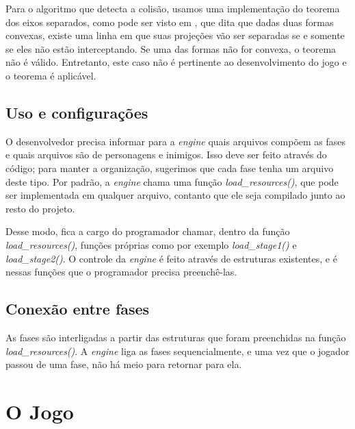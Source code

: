\documentclass[brazil]{abnt}
\begin{document}
Para o algoritmo que detecta a colisão, usamos uma implementação do teorema dos eixos separados, como pode ser visto em \cite{SeparatingAxes}, que dita que dadas duas formas convexas, existe uma linha em que suas projeções vão ser separadas se e somente se eles não estão interceptando. Se uma das formas não for convexa, o teorema não é válido. Entretanto, este caso não é pertinente ao desenvolvimento do jogo e o teorema é aplicável.

\section{Uso e configurações}

O desenvolvedor precisa informar para a \textit{engine} quais arquivos compõem as fases e quais arquivos são de personagens e inimigos. Isso deve ser feito através do código; para manter a organização, sugerimos que cada fase tenha um arquivo deste tipo. Por padrão, a \textit{engine} chama uma função \textit{load\_resources()}, que pode ser implementada em qualquer arquivo, contanto que ele seja compilado junto ao resto do projeto.

Desse modo, fica a cargo do programador chamar, dentro da função \textit{load\_resources()}, funções próprias como por exemplo \textit{load\_stage1()} e \textit{load\_stage2()}. O controle da \textit{engine} é feito através de estruturas existentes, e é nessas funções que o programador precisa preenchê-las.




\section{Conexão entre fases}

As fases são interligadas a partir das estruturas que foram preenchidas na função \textit{load\_resources()}. A \textit{engine} liga as fases sequencialmente, e uma vez que o jogador passou de uma fase, não há meio para retornar para ela.

\chapter{O Jogo}
\end{document}
